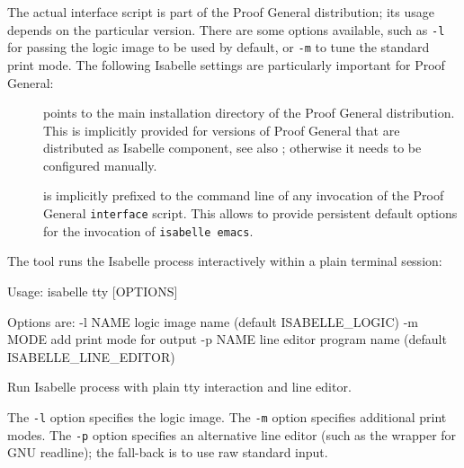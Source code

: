 \begin{isabellebody}
\begin{isamarkuptext}
  The actual interface script is part of the Proof General
  distribution; its usage depends on the particular version.  There
  are some options available, such as \verb|-l| for passing the
  logic image to be used by default, or \verb|-m| to tune the
  standard print mode.  The following Isabelle settings are
  particularly important for Proof General:

  \begin{description}

  \item[\hypertarget{setting.PROOFGENERAL-HOME}{\hyperlink{setting.PROOFGENERAL-HOME}{\mbox{}}}] points to the main
  installation directory of the Proof General distribution.  This is
  implicitly provided for versions of Proof General that are
  distributed as Isabelle component, see also ;
  otherwise it needs to be configured manually.

  \item[\hypertarget{setting.PROOFGENERAL-OPTIONS}{\hyperlink{setting.PROOFGENERAL-OPTIONS}{\mbox{}}}] is implicitly prefixed to
  the command line of any invocation of the Proof General \verb|interface| script.  This allows to provide persistent default
  options for the invocation of \texttt{isabelle emacs}.

  \end{description}%
\end{isamarkuptext}%
\isamarkuptrue%
%
\isamarkuptrue%
%
\begin{isamarkuptext}%
The \hypertarget{tool.tty}{\hyperlink{tool.tty}{\mbox{}}} tool runs the Isabelle process interactively
  within a plain terminal session:
\begin{ttbox}
Usage: isabelle tty [OPTIONS]

  Options are:
    -l NAME      logic image name (default ISABELLE_LOGIC)
    -m MODE      add print mode for output
    -p NAME      line editor program name (default ISABELLE_LINE_EDITOR)

  Run Isabelle process with plain tty interaction and line editor.
\end{ttbox}

  The \verb|-l| option specifies the logic image.  The
  \verb|-m| option specifies additional print modes.  The
  \verb|-p| option specifies an alternative line editor (such
  as the \hypertarget{executable.rlwrap}{\hyperlink{executable.rlwrap}{\mbox{}}} wrapper for GNU readline); the
  fall-back is to use raw standard input.


\end{isamarkuptext}
\end{isabellebody}
